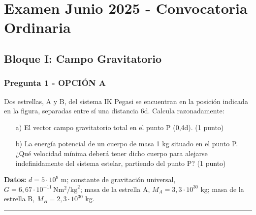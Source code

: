\chapter{Examen Junio 2025 - Convocatoria Ordinaria}
\label{chap:2025_jun_ord}

\section{Bloque I: Campo Gravitatorio}
\label{sec:grav_2025_jun_ord}

\subsection{Pregunta 1 - OPCIÓN A}
\label{subsec:1A_2025_jun_ord}

\begin{cajaenunciado}
Dos estrellas, A y B, del sistema IK Pegasi se encuentran en la posición indicada en la figura, separadas entre sí una distancia 6d. Calcula razonadamente:
\begin{enumerate}
    \item[a)] El vector campo gravitatorio total en el punto P (0,4d). (1 punto)
    \item[b)] La energía potencial de un cuerpo de masa 1 kg situado en el punto P. ¿Qué velocidad mínima deberá tener dicho cuerpo para alejarse indefinidamente del sistema estelar, partiendo del punto P? (1 punto)
\end{enumerate}
\textbf{Datos:} $d=5\cdot10^{9}$ m; constante de gravitación universal, $G=6,67\cdot10^{-11}\,\text{N}\text{m}^2/\text{kg}^2$; masa de la estrella A, $M_{A}=3,3\cdot10^{30}$ kg; masa de la estrella B, $M_{B}=2,3\cdot10^{30}$ kg.
\end{cajaenunciado}
\hrule

